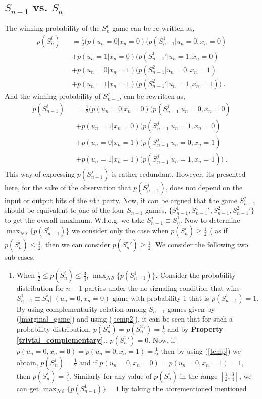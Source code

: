 \begin{widetext}
\begin{appendices}
\subsection*{$S_{n-1}$ vs. $S_n$}
The winning probability of the $S_{n}^i$ game can be re-written as,
\begin{eqnarray}
\label{temp}
p({S_n^i}) &&= \frac{1}{2} \bigg( p(u_n=0|x_n=0)(p(S_{n-1}^1|{u_n=0,x_n=0}){}\nonumber\\&&+p(u_n=1|x_n=0)(p({S_{n-1}^1}'|{u_n=1,x_n=0}){}\nonumber\\&&
+p(u_n=0|x_n=1)(p({S_{n-1}^2}|{u_n=0,x_n=1}){}\nonumber\\&&+p(u_n=1|x_n=1)(p({S_{n-1}^2}'|{u_n=1,x_n=1}) \bigg) \; .
\end{eqnarray}
And the winning probability of $S_{n-1}^j$, can be rewritten as,
\begin{eqnarray}
\label{temp2}
p({S_{n-1}^i}) &&= \frac{1}{2} \bigg( p(u_n=0|x_n=0)(p(S_{n-1}^j|{u_n=0,x_n=0}){}\nonumber\\&&+p(u_n=1|x_n=0)(p({S_{n-1}^j}|{u_n=1,x_n=0}){}\nonumber\\&&
+p(u_n=0|x_n=1)(p({S_{n-1}^j}|{u_n=0,x_n=1}){}\nonumber\\&&+p(u_n=1|x_n=1)(p({S_{n-1}^j}|{u_n=1,x_n=1}) \bigg) \; .
\end{eqnarray}
This way of expressing $p(S_{n-1}^j)$ is rather redundant. However, its presented here, for the sake of the observation that $p(S_{n-1}^j)$, does not depend on the input or output bits of the $n$th party. Now, it can be argued that the game $S_{n-1}
^j$ should be equivalent to one of the four $S_{n-1}$ games, $\{S_{n-1}^1,{S_{n-1}^1}',S_{n-1}^2,{S_{n-1}^2}'\}$ to get the overall maximum. W.l.o.g. we take $S_{n-1}^j \equiv S_n^1$. Now to determine $\max_{\mathcal{NS}}\{p({S_{n-1}^l})\}$ we consider only the case when $p({S_n^i}) \ge \frac{1}{2}$ ( as if $p({S_n^i}) \le \frac{1}{2}$, then we can consider $p({{S_n^i}{'}}) \ge \frac{1}{2}$.  We consider the following two sub-cases,
\begin{enumerate}
\item When $\frac{1}{2} \le p({S_n^i}) \le \frac{3}{4}$, $\max_{\mathcal{NS}}\{p({S_{n-1}^1})\}$. Consider the probability distribution for $n-1$ parties under the no-signaling condition that wins $S_{n-1}^1 \equiv S_{n}^i||(u_n=0,x_n=0)$ game with probability 1 that is $p({S_{n-1}^1})=1$. By using complementarity relation among $S_{n-1}$ games given by (\ref{marginal_game}) and using (\ref{temp2}), it can be seen that for such a probability distribution, $p({S_{n}^2})=p({S_{n}^2}')=\frac{1}{2}$ and by \textbf{Property \ref{trivial_complementary}.}, $p({S_{n}^1}')=0$. Now, if $p(u_n=0,x_n=0)=p(u_n=0,x_n=1)=\frac{1}{2}$ then by using (\ref{temp}) we obtain, $p({S_n^i})=\frac{1}{2}$ and if  $p(u_n=0,x_n=0)=p(u_n=0,x_n=1)=1$, then $p({S_n^i})=\frac{3}{4}$. Similarly for any value of $p({S_n^i})$ in the range $[\frac{1}{2},\frac{3}{4}]$, we can get $\max_{\mathcal{NS}}\{p({S_{n-1}^1})\}=1$ by taking the aforementioned mentioned 

\end{enumerate}
\end{appendices}
\end{widetext}
